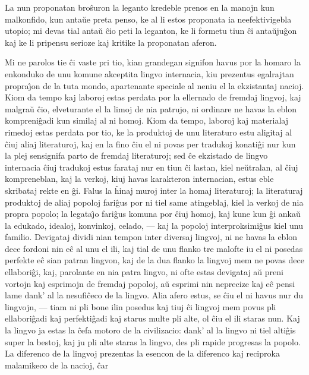 
   La nun proponatan bro\^suron la leganto kredeble prenos en la manojn
kun malkonfido, kun anta\u ue preta penso, ke al li estos proponata
ia neefektivigebla utopio; mi devas tial anta\u u \^cio peti la
leganton, ke li formetu tiun \^ci anta\u uju\^gon kaj ke li pripensu
serioze kaj kritike la proponatan aferon.

   Mi ne parolos tie \^ci vaste pri tio, kian grandegan signifon havus
por la homaro la enkonduko de unu komune akceptita lingvo
internacia, kiu prezentus egalrajtan propra\^{\j}on de la tuta
mondo, apartenante speciale al neniu el la ekzistantaj nacioj. Kiom
da tempo kaj laboroj estas perdata por la ellernado de fremdaj
lingvoj, kaj malgra\u u \^cio, elveturante el la limoj de nia
patrujo, ni ordinare ne havas la eblon kompreni\^gadi kun similaj al
ni homoj. Kiom da tempo, laboroj kaj materialaj rimedoj estas
perdata por tio, ke la produktoj de unu literaturo estu aligitaj al
\^ciuj aliaj literaturoj, kaj en la fino \^ciu el ni povas per
tradukoj konati\^gi nur kun la plej sensignifa parto de fremdaj
literaturoj; sed \^ce ekzistado de lingvo internacia \^ciuj tradukoj
estus farataj nur en tiun \^ci lastan, kiel ne\u utralan, al \^ciuj
kompreneblan, kaj la verkoj, kiuj havas karakteron internacian,
estus eble skribataj rekte en \^gi. Falus la \^hinaj muroj inter la
homaj literaturoj; la literaturaj produktoj de aliaj popoloj
fari\^gus por ni tiel same atingeblaj, kiel la verkoj de nia propra
popolo; la legata\^{\j}o fari\^gus komuna por \^ciuj homoj, kaj kune
kun \^gi anka\u u la edukado, idealoj, konvinkoj, celado, --- kaj la
popoloj interproksimi\^gus kiel unu familio. Devigataj dividi nian
tempon inter diversaj lingvoj, ni ne havas la eblon dece fordoni nin
e\^c al unu el ili, kaj tial de unu flanko tre malofte iu el ni
posedas perfekte e\^c sian patran lingvon, kaj de la dua flanko la
lingvoj mem ne povas dece ellabori\^gi, kaj, parolante en nia patra
lingvo, ni ofte estas devigataj a\u u preni vortojn kaj esprimojn de
fremdaj popoloj, a\u u esprimi nin neprecize kaj e\^c pensi lame
dank' al la nesufi\^ceco de la lingvo. Alia afero estus, se \^ciu el
ni havus nur du lingvojn, --- tiam ni pli bone ilin posedus kaj tiuj
\^ci lingvoj mem povus pli ellabori\^gadi kaj perfekti\^gadi kaj
starus multe pli alte, ol \^ciu el ili staras nun. Kaj la lingvo ja
estas la \^cefa motoro de la civilizacio: dank' al la lingvo ni tiel
alti\^gis super la bestoj, kaj ju pli alte staras la lingvo, des pli
rapide progresas la popolo. La diferenco de la lingvoj prezentas la
esencon de la diferenco kaj reciproka malamikeco de la nacioj, \^car

